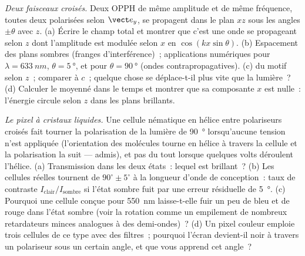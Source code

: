 \begin{exercise}[$\star\star\star$]\label{exo:b2:plane-waves-polarization:10}
\emph{Deux faisceaux croisés.} Deux OPPH de même amplitude et de même
fréquence, toutes deux polarisées selon $\vect e_y$, se propagent dans le plan $xz$
sous les angles $\pm\theta$ avec $z$. (a) Écrire le champ total et montrer que c'est une
onde se propageant selon $z$ dont l'amplitude est modulée selon $x$ en
$\cos(kx\sin\theta)$. (b) Espacement des plans sombres (franges
d'interférence)~; applications numériques pour $\lambda = \qty{633}{nm}$, $\theta = \qty{5}{\degree}$, et pour
$\theta = \qty{90}{\degree}$ (ondes contrapropagatives). (c)  du
motif selon $z$~; comparer à $c$~; quelque chose se déplace-t-il plus vite que la
lumière~? (d) Calculer le  moyenné dans le temps et montrer que sa
composante $x$ est nulle~: l'énergie circule selon $z$ dans les plans
brillants.
\end{exercise}

\begin{exercise}[$\star\star\star$]\label{exo:b2:plane-waves-polarization:11}
\emph{Le pixel à cristaux liquides.} Une cellule nématique en hélice entre
polariseurs croisés fait tourner la polarisation de la lumière de \qty{90}{\degree}
lorsqu'aucune tension n'est appliquée (l'orientation des molécules tourne en hélice à travers
la cellule et la polarisation la suit --- admis), et pas du tout
lorsque quelques volts déroulent l'hélice. (a) Transmission dans les deux états~: lequel
est brillant~? (b) Les cellules réelles tournent de $90^\circ \pm 5^\circ$ à la longueur d'onde
de conception~: taux de contraste $I_{\text{clair}}/I_{\text{sombre}}$ si l'état sombre
fuit par une erreur résiduelle de \qty{5}{\degree}. (c) Pourquoi une cellule
conçue pour \qty{550}{nm} laisse-t-elle fuir un peu de bleu et de rouge dans l'état sombre
(voir la rotation comme un empilement de nombreux retardateurs minces analogues à des
demi-ondes)~? (d) Un pixel couleur emploie trois cellules de ce type avec des filtres~; pourquoi
l'écran devient-il noir à travers un polariseur sous un certain angle, et que
vous apprend cet angle~?
\end{exercise}

